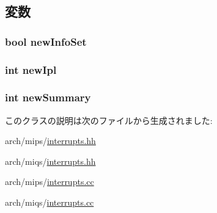 \subsection{変数}
\hypertarget{classMipsISA_1_1Interrupts_af2d03360eddc7a37308f528ec004d1aa}{
\subsubsection[{newInfoSet}]{\setlength{\rightskip}{0pt plus 5cm}bool {\bf newInfoSet}}}
\label{classMipsISA_1_1Interrupts_af2d03360eddc7a37308f528ec004d1aa}
\hypertarget{classMipsISA_1_1Interrupts_a1de149de9a59d4b8291c2aa655119825}{
\subsubsection[{newIpl}]{\setlength{\rightskip}{0pt plus 5cm}int {\bf newIpl}}}
\label{classMipsISA_1_1Interrupts_a1de149de9a59d4b8291c2aa655119825}
\hypertarget{classMipsISA_1_1Interrupts_ad13b7544dc5de8549f52b32df52e0d72}{
\subsubsection[{newSummary}]{\setlength{\rightskip}{0pt plus 5cm}int {\bf newSummary}}}
\label{classMipsISA_1_1Interrupts_ad13b7544dc5de8549f52b32df52e0d72}


このクラスの説明は次のファイルから生成されました:\begin{DoxyCompactItemize}
\item 
arch/mips/\hyperlink{mips_2interrupts_8hh}{interrupts.hh}\item 
arch/miqs/\hyperlink{miqs_2interrupts_8hh}{interrupts.hh}\item 
arch/mips/\hyperlink{mips_2interrupts_8cc}{interrupts.cc}\item 
arch/miqs/\hyperlink{miqs_2interrupts_8cc}{interrupts.cc}\end{DoxyCompactItemize}
